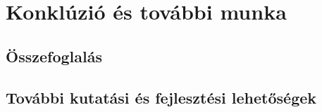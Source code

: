 \chapter{Konklúzió és további munka}

\section{Összefoglalás}

\section{További kutatási és fejlesztési lehetőségek}